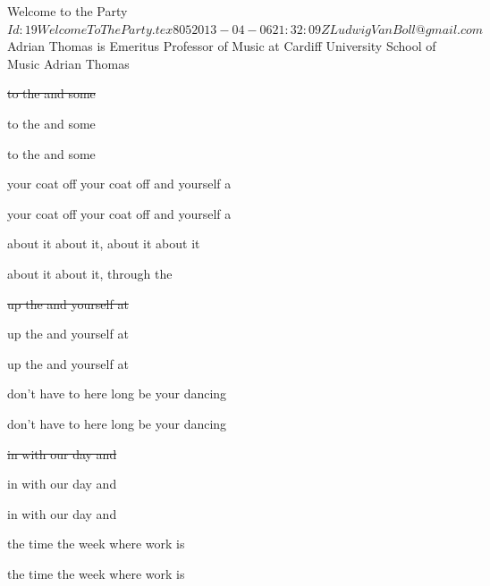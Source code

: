 \begin{SBSong}{Welcome to the Party}
  {$Id: 19WelcomeToTheParty.tex 805 2013-04-06 21:32:09Z LudwigVanBoll@gmail.com $}
  {Adrian Thomas is Emeritus Professor of Music at Cardiff University School of Music}
  {Adrian Thomas}
  \begin{SBVerse}
    \sout{ to the  and   some  }
	
     to the  and   some  
	
     to the  and   some  
	
     your coat off  your coat off and  yourself a 

     your coat off  your coat off and  yourself a 
  \end{SBVerse}
  \begin{SBChorus}
     about it  about it,  about it  about it

     about it  about it,  through the 
  \end{SBChorus}
  \begin{SBVerse}
    \sout{ up the  and  yourself at }

     up the  and  yourself at 

     up the  and  yourself at 

     don't have to  here long be your dancing 

     don't have to  here long be your dancing 
  \end{SBVerse}
  \begin{SBVerse}
    \sout{ in with our   day and }
    
     in with our   day and 
    
     in with our   day and 

     the time  the week where  work is 

     the time  the week where  work is 
  \end{SBVerse}
\end{SBSong}
